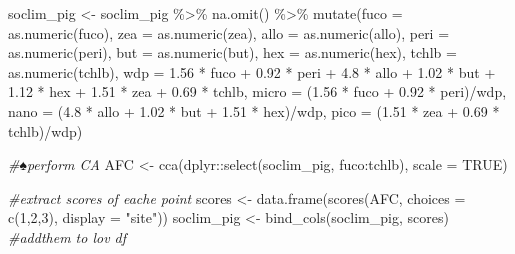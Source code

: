 \documentclass[
]{article}
\newenvironment{Shaded}{\begin{snugshade}}{\end{snugshade}}
\newcommand{\AttributeTok}[1]{\textcolor[rgb]{0.77,0.63,0.00}{#1}}
\newcommand{\CommentTok}[1]{\textcolor[rgb]{0.56,0.35,0.01}{\textit{#1}}}
\newcommand{\ConstantTok}[1]{\textcolor[rgb]{0.00,0.00,0.00}{#1}}
\newcommand{\DecValTok}[1]{\textcolor[rgb]{0.00,0.00,0.81}{#1}}
\newcommand{\FloatTok}[1]{\textcolor[rgb]{0.00,0.00,0.81}{#1}}
\newcommand{\FunctionTok}[1]{\textcolor[rgb]{0.00,0.00,0.00}{#1}}
\newcommand{\NormalTok}[1]{#1}
\newcommand{\OtherTok}[1]{\textcolor[rgb]{0.56,0.35,0.01}{#1}}
\newcommand{\SpecialCharTok}[1]{\textcolor[rgb]{0.00,0.00,0.00}{#1}}
\newcommand{\StringTok}[1]{\textcolor[rgb]{0.31,0.60,0.02}{#1}}
\begin{document}
\begin{Shaded}
\begin{Highlighting}[]
\NormalTok{soclim\_pig }\OtherTok{\textless{}{-}}\NormalTok{ soclim\_pig }\SpecialCharTok{\%\textgreater{}\%} \FunctionTok{na.omit}\NormalTok{() }\SpecialCharTok{\%\textgreater{}\%} 
  \FunctionTok{mutate}\NormalTok{(}\AttributeTok{fuco =} \FunctionTok{as.numeric}\NormalTok{(fuco),}
         \AttributeTok{zea =} \FunctionTok{as.numeric}\NormalTok{(zea),}
         \AttributeTok{allo =} \FunctionTok{as.numeric}\NormalTok{(allo),}
         \AttributeTok{peri =} \FunctionTok{as.numeric}\NormalTok{(peri),}
         \AttributeTok{but =} \FunctionTok{as.numeric}\NormalTok{(but),}
         \AttributeTok{hex =} \FunctionTok{as.numeric}\NormalTok{(hex),}
         \AttributeTok{tchlb =} \FunctionTok{as.numeric}\NormalTok{(tchlb),}
         \AttributeTok{wdp =} \FloatTok{1.56} \SpecialCharTok{*}\NormalTok{ fuco }\SpecialCharTok{+} \FloatTok{0.92} \SpecialCharTok{*}\NormalTok{ peri }\SpecialCharTok{+} \FloatTok{4.8} \SpecialCharTok{*}\NormalTok{ allo }\SpecialCharTok{+} \FloatTok{1.02} \SpecialCharTok{*}\NormalTok{ but }\SpecialCharTok{+} \FloatTok{1.12} \SpecialCharTok{*}\NormalTok{ hex }\SpecialCharTok{+} \FloatTok{1.51} \SpecialCharTok{*}\NormalTok{ zea }\SpecialCharTok{+} \FloatTok{0.69} \SpecialCharTok{*}\NormalTok{ tchlb,}
         \AttributeTok{micro =}\NormalTok{ (}\FloatTok{1.56} \SpecialCharTok{*}\NormalTok{ fuco }\SpecialCharTok{+} \FloatTok{0.92} \SpecialCharTok{*}\NormalTok{ peri)}\SpecialCharTok{/}\NormalTok{wdp,}
         \AttributeTok{nano =}\NormalTok{ (}\FloatTok{4.8} \SpecialCharTok{*}\NormalTok{ allo }\SpecialCharTok{+} \FloatTok{1.02} \SpecialCharTok{*}\NormalTok{ but }\SpecialCharTok{+} \FloatTok{1.51} \SpecialCharTok{*}\NormalTok{ hex)}\SpecialCharTok{/}\NormalTok{wdp,}
         \AttributeTok{pico =}\NormalTok{ (}\FloatTok{1.51} \SpecialCharTok{*}\NormalTok{ zea }\SpecialCharTok{+} \FloatTok{0.69} \SpecialCharTok{*}\NormalTok{ tchlb)}\SpecialCharTok{/}\NormalTok{wdp)}

\CommentTok{\#♠perform CA}
\NormalTok{AFC }\OtherTok{\textless{}{-}} \FunctionTok{cca}\NormalTok{(dplyr}\SpecialCharTok{::}\FunctionTok{select}\NormalTok{(soclim\_pig, fuco}\SpecialCharTok{:}\NormalTok{tchlb), }\AttributeTok{scale =} \ConstantTok{TRUE}\NormalTok{)}

\CommentTok{\#extract scores of eache point}
\NormalTok{scores }\OtherTok{\textless{}{-}} \FunctionTok{data.frame}\NormalTok{(}\FunctionTok{scores}\NormalTok{(AFC, }\AttributeTok{choices =} \FunctionTok{c}\NormalTok{(}\DecValTok{1}\NormalTok{,}\DecValTok{2}\NormalTok{,}\DecValTok{3}\NormalTok{), }\AttributeTok{display =} \StringTok{"site"}\NormalTok{))}
\NormalTok{soclim\_pig }\OtherTok{\textless{}{-}} \FunctionTok{bind\_cols}\NormalTok{(soclim\_pig, scores) }\CommentTok{\#addthem to lov df}


\end{Highlighting}
\end{Shaded}
\end{document}
